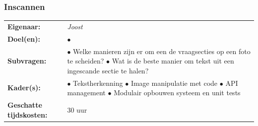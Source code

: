 \documentclass[12pt]{article}
\begin{document}
\subsubsection{Inscannen}
\begin{tabularx}{\linewidth}{@{}ll}
    \textbf{Eigenaar: } & \textit{Joost} \\
    \textbf{Doel(en): } & 
        \makecell[tl]{
            $\bullet$  \\
        } \\
    \textbf{Subvragen: } & 
        \makecell[tl]{
            $\bullet$ Welke manieren zijn er om een de vraagsecties op een foto te scheiden? \\
            $\bullet$ Wat is de beste manier om tekst uit een ingescande sectie te halen? \\
        }\\
    \textbf{Kader(s): } & 
        \makecell[tl]{
            $\bullet$ Tekstherkenning\\
            $\bullet$ Image manipulatie met code\\
            $\bullet$ API management\\
            $\bullet$ Modulair opbouwen systeem en unit tests\\
        }\\
    \parbox[t]{3cm}{\raggedright\textbf{Geschatte  tijdskosten:} } & 30 uur \\
\end{tabularx}
\end{document}

